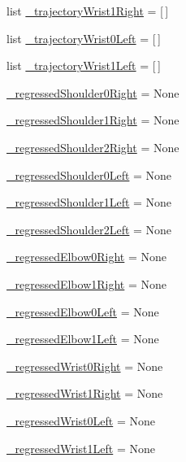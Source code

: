 \begin{DoxyCompactItemize}
list \mbox{\hyperlink{namespaceinterpolate__multiple__steering_af225602db5906d7bf0e5a86a6f48d15d}{\+\_\+trajectory\+Wrist1\+Right}} = \mbox{[}$\,$\mbox{]}
\item 
list \mbox{\hyperlink{namespaceinterpolate__multiple__steering_a104b7ddf79d7a5ed99b5b63184c04de4}{\+\_\+trajectory\+Wrist0\+Left}} = \mbox{[}$\,$\mbox{]}
\item 
list \mbox{\hyperlink{namespaceinterpolate__multiple__steering_a846b206f61caa65a1e455494aacbd913}{\+\_\+trajectory\+Wrist1\+Left}} = \mbox{[}$\,$\mbox{]}
\item 
\mbox{\hyperlink{namespaceinterpolate__multiple__steering_a45f71b33d36663398a75474106651f39}{\+\_\+regressed\+Shoulder0\+Right}} = None
\item 
\mbox{\hyperlink{namespaceinterpolate__multiple__steering_a4d343d8e78cd16f27aee97240e274550}{\+\_\+regressed\+Shoulder1\+Right}} = None
\item 
\mbox{\hyperlink{namespaceinterpolate__multiple__steering_aa5d0ddcb8442bcc733e9df0267bb9c6b}{\+\_\+regressed\+Shoulder2\+Right}} = None
\item 
\mbox{\hyperlink{namespaceinterpolate__multiple__steering_af283ab356a8b3a9d0111289f8e727fd3}{\+\_\+regressed\+Shoulder0\+Left}} = None
\item 
\mbox{\hyperlink{namespaceinterpolate__multiple__steering_aa1b2235d71bd9697dbf19625bade8cfe}{\+\_\+regressed\+Shoulder1\+Left}} = None
\item 
\mbox{\hyperlink{namespaceinterpolate__multiple__steering_a03acc9a6fcf2a4ce8542c9a61342c052}{\+\_\+regressed\+Shoulder2\+Left}} = None
\item 
\mbox{\hyperlink{namespaceinterpolate__multiple__steering_a5b39175fe5cb5097330053c76f3828fa}{\+\_\+regressed\+Elbow0\+Right}} = None
\item 
\mbox{\hyperlink{namespaceinterpolate__multiple__steering_a1310a9b5d6d63f9334bd5662bcf0d126}{\+\_\+regressed\+Elbow1\+Right}} = None
\item 
\mbox{\hyperlink{namespaceinterpolate__multiple__steering_ac463fb7c016c04b281794b9824c2c2b3}{\+\_\+regressed\+Elbow0\+Left}} = None
\item 
\mbox{\hyperlink{namespaceinterpolate__multiple__steering_a1411b77de6197847319a35bed4b4e55f}{\+\_\+regressed\+Elbow1\+Left}} = None
\item 
\mbox{\hyperlink{namespaceinterpolate__multiple__steering_a4b88950af2a323f5fd104e0bb5564d36}{\+\_\+regressed\+Wrist0\+Right}} = None
\item 
\mbox{\hyperlink{namespaceinterpolate__multiple__steering_a69e81f27ef35186db37acf95f6723941}{\+\_\+regressed\+Wrist1\+Right}} = None
\item 
\mbox{\hyperlink{namespaceinterpolate__multiple__steering_a9f004119f4deece93990a2cf6410c0c7}{\+\_\+regressed\+Wrist0\+Left}} = None
\item 
\mbox{\hyperlink{namespaceinterpolate__multiple__steering_a714780206ef20855c73778c4e0fe6516}{\+\_\+regressed\+Wrist1\+Left}} = None
\end{DoxyCompactItemize}



